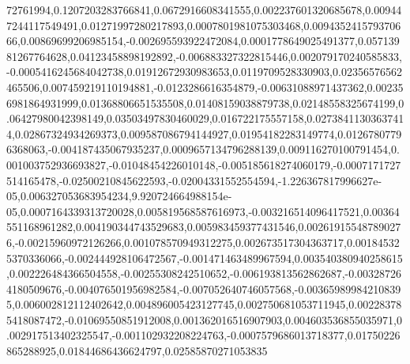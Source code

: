 72761994,0.1207203283766841,0.0672916608341555,0.002237601320685678,0.009447244117549491,0.01271997280217893,0.0007801981075303468,0.009435241579370666,0.00869699206985154,-0.002695593922472084,0.0001778649025491377,0.05713981267764628,0.04123458898192892,-0.006883327322815446,0.002079170240585833,-0.0005416245684042738,0.01912672930983653,0.0119709528330903,0.02356576562465506,0.007459219110194881,-0.0123286616354879,-0.00631088971437362,0.002356981864931999,0.01368806651535508,0.01408159038879738,0.02148558325674199,0.06427980042398149,0.03503497830460029,0.016722175557158,0.02738411303637414,0.02867324934269373,0.009587086794144927,0.01954182283149774,0.01267807796368063,-0.004187435067935237,0.0009657134796288139,0.009116270100791454,0.001003752936693827,-0.01048454226010148,-0.005185618274060179,-0.0007171727514165478,-0.02500210845622593,-0.02004331552554594,-1.226367817996627e-05,0.006327053683954234,9.920724664988154e-05,0.0007164339313720028,0.005819568587616973,-0.003216514096417521,0.00364551168961282,0.004190344743529683,0.005983459377431546,0.002619155487890276,-0.00215960972126266,0.001078570949312275,0.002673517304363717,0.001845325370336066,-0.002444928106472567,-0.001471463489967594,0.003540380940258615,0.002226484366504558,-0.00255308242510652,-0.006193813562862687,-0.003287264180509676,-0.004076501956982584,-0.007052640746057568,-0.003659899842108395,0.006002812112402642,0.004896005423127745,0.002750681053711945,0.002283785418087472,-0.01069550851912008,0.001362016516907903,0.004603536855035971,0.002917513402325547,-0.001102932208224763,-0.0007579686013718377,0.01750226865288925,0.01844686436624797,0.02585870271053835

